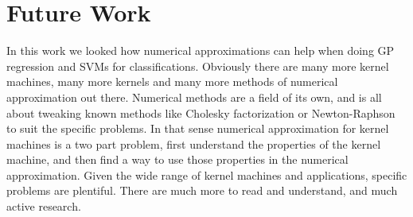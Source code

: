 \documentclass{article}
\theoremstyle{plain}
\theoremstyle{definition}
\theoremstyle{remark}
\begin{document}
\section{Future Work}
In this work we looked how numerical approximations can help when doing GP regression and SVMs for classifications.
Obviously there are many more kernel machines, many more kernels and many more methods of numerical approximation out there.
Numerical methods are a field of its own, and is all about tweaking known methods like Cholesky factorization or Newton-Raphson to suit the specific problems.
In that sense numerical approximation for kernel machines is a two part problem, first understand the properties of the kernel machine, and then find a way to use those properties in the numerical approximation.
Given the wide range of kernel machines and applications, specific problems are plentiful.
There are much more to read and understand, and much active research.


\printbibliography
\end{document}
